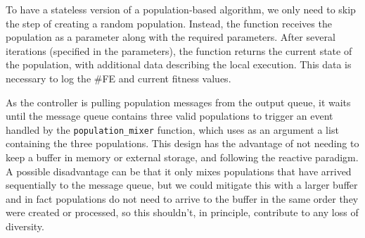 \documentclass[runningheads]{llncs}
\begin{document}
To have a stateless version of a population-based algorithm, we only need to
skip the step of creating a random population. Instead, the function receives
the population as a parameter along with the required parameters. After several
iterations (specified in the parameters), the function returns the current state
of the population, with additional data describing the local execution. This
data is necessary to log the \#FE and current fitness values.



As the controller is pulling population messages from the output
queue, it waits until the message queue contains three valid
populations to trigger an event handled by the
\texttt{population\_mixer} function, which uses as an argument a list
containing the three populations. This design has the advantage of not
needing to keep a buffer in memory or external storage, and following
the reactive paradigm. A possible disadvantage can be that it only
mixes populations that have arrived sequentially to the message queue,
but we could mitigate this with a larger buffer and in fact
populations do not need to arrive to the buffer in the same order they
were created or processed, so this shouldn't, in principle, contribute
to any loss of diversity. %
\end{document}
